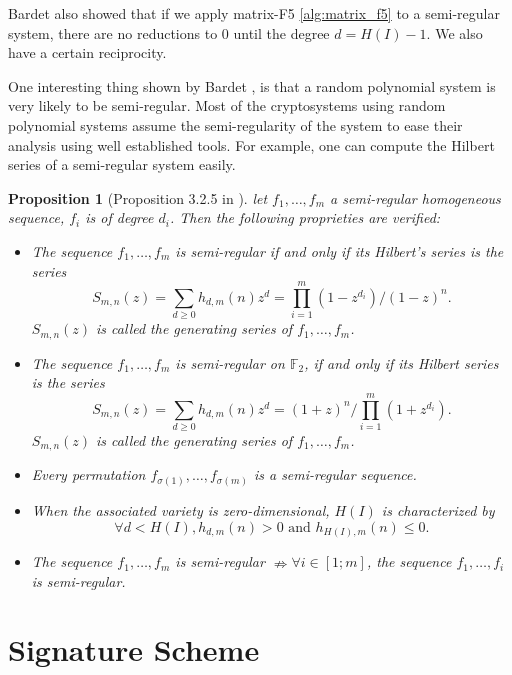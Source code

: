\documentclass[english]{article}
\newtheorem{proposition}{Proposition}[section]
\begin{document}
		Bardet also showed that if we apply matrix-F5 \ref{alg:matrix_f5} to a semi-regular system, there are no reductions to 0 until the degree $d = H(I) - 1$. We also have a certain reciprocity.
		
		One interesting thing shown by Bardet \cite{Bardet04}, is that a random polynomial system is very likely to be semi-regular. Most of the cryptosystems using random polynomial systems assume the semi-regularity of the system to ease their analysis using well established tools. For example, one can compute the Hilbert series of a semi-regular system easily.
		
		\begin{proposition}[Proposition 3.2.5 in \cite{Bardet04}]\label{PropSemi}
			let $f_1,\dots,f_m$ a semi-regular homogeneous sequence, $f_i$ is of degree $d_i$. Then the following proprieties are verified:
			\begin{itemize}
				\item The sequence $f_1,\dots,f_m$ is semi-regular if and only if its Hilbert's series is the series $$S_{m, n}(z) = \sum_{d \geq 0}h_{d, m}(n)z^d = \prod_{i=1}^{m}(1-z^{d_i})/(1-z)^n.$$ $S_{m, n}(z)$ is called the generating series of $f_1,\dots,f_m$.
				\item The sequence $f_1,\dots,f_m$ is semi-regular on $\mathbb{F}_2$, if and only if its Hilbert series is the series $$S_{m, n}(z) = \sum_{d \geq 0}h_{d, m}(n)z^d = (1+z)^n/\prod_{i=1}^{m}(1+z^{d_i}).$$ $S_{m, n}(z)$ is called the generating series of $f_1,\dots,f_m$.
				\item Every permutation $f_{\sigma(1)},\dots,f_{\sigma(m)}$ is a semi-regular sequence.
				\item When the associated variety is zero-dimensional, $H(I)$ is characterized by
				$$
				\forall d < H(I), h_{d, m}(n) > 0 \text{ and } h_{H(I), m}(n) \leq 0.
				$$
				\item The sequence $f_1,\dots,f_m$ is semi-regular $\nRightarrow \forall i \in [1;m]$, the sequence $f_1,\dots,f_i$ is semi-regular. 
			\end{itemize}
		\end{proposition}
		
	\section{Signature Scheme}
\end{document}
